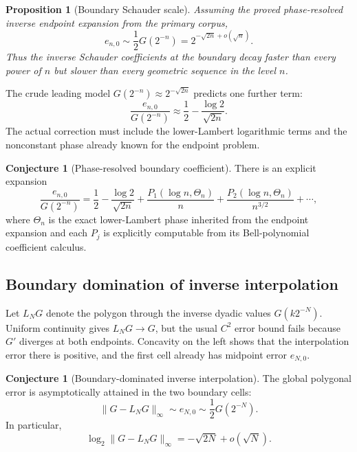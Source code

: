 \documentclass[11pt]{article}
\newtheorem{proposition}[theorem]{Proposition}
\theoremstyle{definition}
\newtheorem{conjecture}[theorem]{Conjecture}
\theoremstyle{remark}
\begin{document}
\begin{proposition}[Boundary Schauder scale]
\label{p3:prop:boundary-Schauder}
Assuming the proved phase-resolved inverse endpoint expansion from the primary
corpus,
\begin{equation}\label{p3:eq:e-boundary-asymptotic}
 e_{n,0}\sim\frac12G(2^{-n})
 =2^{-\sqrt{2n}+o(\sqrt n)}.
\end{equation}
Thus the inverse Schauder coefficients at the boundary decay faster than every
power of $n$ but slower than every geometric sequence in the level $n$.
\end{proposition}

The crude leading model $G(2^{-n})\approx2^{-\sqrt{2n}}$ predicts one further
term:
\begin{equation}\label{p3:eq:e-boundary-model}
 \frac{e_{n,0}}{G(2^{-n})}
 \approx\frac12-\frac{\log2}{\sqrt{2n}}.
\end{equation}
The actual correction must include the lower-Lambert logarithmic terms and the
nonconstant phase already known for the endpoint problem.

\begin{conjecture}[Phase-resolved boundary coefficient]
\label{p3:conj:inverse-boundary-phase}
There is an explicit expansion
\begin{equation}\label{p3:eq:e-boundary-phase-conj}
 \frac{e_{n,0}}{G(2^{-n})}
 =\frac12-\frac{\log2}{\sqrt{2n}}
  +\frac{P_1(\log n,\Theta_n)}{n}
  +\frac{P_2(\log n,\Theta_n)}{n^{3/2}}+\cdots,
\end{equation}
where $\Theta_n$ is the exact lower-Lambert phase inherited from the endpoint
expansion and each $P_j$ is explicitly computable from its Bell-polynomial
coefficient calculus.
\end{conjecture}

\subsection{Boundary domination of inverse interpolation}

Let $L_NG$ denote the polygon through the inverse dyadic values
$G(k2^{-N})$.  Uniform continuity gives $L_NG\to G$, but the usual $C^2$
error bound fails because $G'$ diverges at both endpoints.  Concavity on the
left shows that the interpolation error there is positive, and the first cell
already has midpoint error $e_{N,0}$.

\begin{conjecture}[Boundary-dominated inverse interpolation]
\label{p3:conj:G-interpolation}
The global polygonal error is asymptotically attained in the two boundary
cells:
\begin{equation}\label{p3:eq:G-interpolation-conj}
 \|G-L_NG\|_\infty
 \sim e_{N,0}
 \sim\frac12G(2^{-N}).
\end{equation}
In particular,
\begin{equation}\label{p3:eq:G-interpolation-rate}
 \log_2\|G-L_NG\|_\infty
 =-\sqrt{2N}+o(\sqrt N).
\end{equation}
\end{conjecture}
\end{document}
